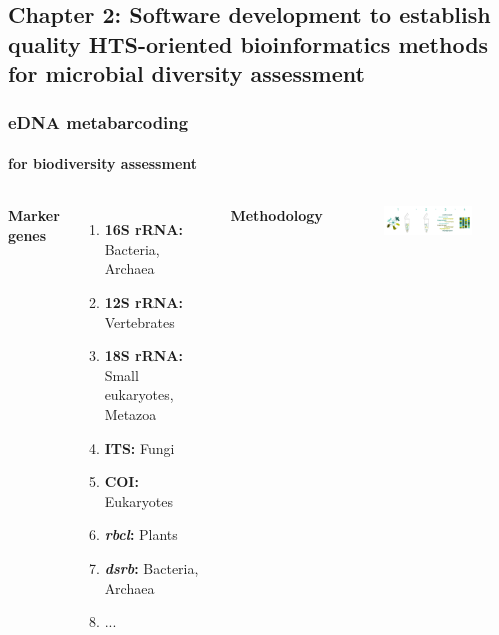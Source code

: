 \documentclass{beamer}
\begin{document}


   \begin{darkframes}
      \section{
      \textbf{Chapter 2}: Software development to establish quality HTS-oriented bioinformatics methods for microbial diversity assessment
      }
   \end{darkframes}

   \begin{frame}
      
      \frametitle{eDNA metabarcoding}
      \framesubtitle{for biodiversity assessment}
      \begin{singlespace}


         \begin{columns}[onlytextwidth]


               \textbf{Marker genes} \\ 

               \begin{enumerate}
                  \item \textbf{16S rRNA:} Bacteria, Archaea
                  \item \textbf{12S rRNA:} Vertebrates
                  \item \textbf{18S rRNA:} Small eukaryotes, Metazoa
                  \item \textbf{ITS:} Fungi
                  \item \textbf{COI:} Eukaryotes
                  \item \textbf{\textit{rbcl}:} Plants
                  \item \textbf{\textit{dsrb}:} Bacteria, Archaea
                  \item ...
               \end{enumerate}


               \textbf{Methodology}

               \begin{figure}
                  \includegraphics[width=55mm]{resources/metabarcoding-steps.png}
               \end{figure}


\end{columns}
\end{singlespace}
\end{frame}
\end{document}
